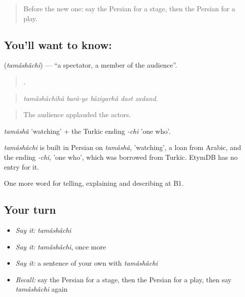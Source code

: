 \label{lesson:FA-C523-tamashachi}



\begin{quote}
Before the new one: say the Persian for a stage, then the Persian for a play.
\end{quote}

\subsection*{You'll want to know: }
\textbf{} (\emph{tamâshâchi}) — \textquotedblleft{}a spectator, a member of the audience\textquotedblright{}.

\begin{quote}
     .
\end{quote}

\begin{quote}
\emph{tamâshâchihâ barâ-ye bâzigarhâ dast zadand.}
\end{quote}

\begin{quote}
The audience applauded the actors.
\end{quote}

\emph{tamâshâ} 'watching' + the Turkic ending \emph{-chi} 'one who'.

\begin{cousinweb}
\emph{tamâshâchi} is built in Persian on \emph{tamâshâ}, 'watching', a loan from Arabic, and the ending \emph{-chi}, 'one who', which was borrowed from Turkic. EtymDB has no entry for it.
\end{cousinweb}

\begin{grammarlens}[title={What you've built}]
One more word for telling, explaining and describing at B1.
\end{grammarlens}

\subsection*{Your turn}
\begin{itemize}
\raggedright
  \item \emph{Say it:} \emph{tamâshâchi}
  \item \emph{Say it:} \emph{tamâshâchi}, once more
  \item \emph{Say it:} a sentence of your own with \emph{tamâshâchi}
  \item \emph{Recall:} say the Persian for a stage, then the Persian for a play, then say \emph{tamâshâchi} again
\end{itemize}

